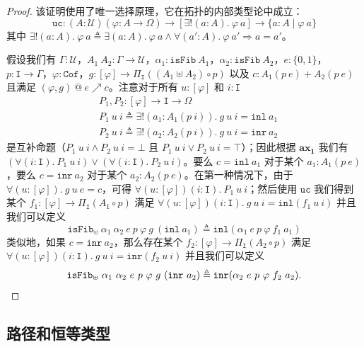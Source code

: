 \documentclass{ctexrep}
\theoremstyle{plain}
\theoremstyle{definition}
\theoremstyle{remark}
\newcommand{\ax}[1]{\mathbf{ax_{#1}}}
\begin{document}
\begin{proof}
该证明使用了唯一选择原理，它在拓扑的内部类型论中成立：
\begin{equation}
\mathtt{uc} : (A : \mathcal{U})(\varphi : A \to \Omega) \to [\exists!(a : A).\ \varphi\ a] \to \{a : A \mid \varphi\ a\}
\end{equation}
其中 $\exists!(a : A).\ \varphi\ a \triangleq \exists(a : A).\ \varphi\ a \land \forall(a' : A).\ \varphi\ a' \Rightarrow a = a'$。

假设我们有 $\Gamma : \mathcal{U}$，$A_1\ A_2 : \Gamma \to \mathcal{U}$，$\alpha_1 : \mathtt{isFib}\ A_1$，$\alpha_2 : \mathtt{isFib}\ A_2$，$e : \{0,1\}$，$p : \mathtt{I} \to \Gamma$，$\varphi : \mathtt{Cof}$，$g : [\varphi] \to \Pi_{\mathtt{I}}((A_1 \uplus A_2) \circ p)$ 以及 $c : A_1(p\ e) + A_2(p\ e)$ 且满足 $(\varphi, g)\ @\ e \nearrow c$。注意对于所有 $u : [\varphi]$ 和 $i : \mathtt{I}$
\begin{align*}
&P_1, P_2 : [\varphi] \to \mathtt{I} \to \Omega \\
&P_1\ u\ i \triangleq \exists!(a_1 : A_1(p\ i)).\ g\ u\ i = \mathtt{inl}\ a_1 \\
&P_2\ u\ i \triangleq \exists!(a_2 : A_2(p\ i)).\ g\ u\ i = \mathtt{inr}\ a_2
\end{align*}
是互补命题（$P_1\ u\ i \land P_2\ u\ i = \bot$ 且 $P_1\ u\ i \lor P_2\ u\ i = \top$）；因此根据 $\ax{1}$ 我们有 $(\forall(i : \mathtt{I}).\ P_1\ u\ i) \lor (\forall(i : \mathtt{I}).\ P_2\ u\ i)$。要么 $c = \mathtt{inl}\ a_1$ 对于某个 $a_1 : A_1(p\ e)$，要么 $c = \mathtt{inr}\ a_2$ 对于某个 $a_2 : A_2(p\ e)$。在第一种情况下，由于 $\forall(u : [\varphi]).\ g\ u\ e = c$，可得 $\forall(u : [\varphi])(i : \mathtt{I}).\ P_1\ u\ i$；然后使用 $\mathtt{uc}$ 我们得到某个 $f_1 : [\varphi] \to \Pi_{\mathtt{I}}(A_1 \circ p)$ 满足 $\forall(u : [\varphi])(i : \mathtt{I}).\ g\ u\ i = \mathtt{inl}(f_1\ u\ i)$ 并且我们可以定义
\[
\mathtt{isFib}_\uplus\ \alpha_1\ \alpha_2\ e\ p\ \varphi\ g\ (\mathtt{inl}\ a_1) \triangleq \mathtt{inl}(\alpha_1\ e\ p\ \varphi\ f_1\ a_1)
\]
类似地，如果 $c = \mathtt{inr}\ a_2$，那么存在某个 $f_2 : [\varphi] \to \Pi_{\mathtt{I}}(A_2 \circ p)$ 满足 $\forall(u : [\varphi])(i : \mathtt{I}).\ g\ u\ i = \mathtt{inr}(f_2\ u\ i)$ 并且我们可以定义
\[
\mathtt{isFib}_\uplus\ \alpha_1\ \alpha_2\ e\ p\ \varphi\ g\ (\mathtt{inr}\ a_2) \triangleq \mathtt{inr}(\alpha_2\ e\ p\ \varphi\ f_2\ a_2). \qedhere
\]
\end{proof}

\subsection{路径和恒等类型}
\end{document}
